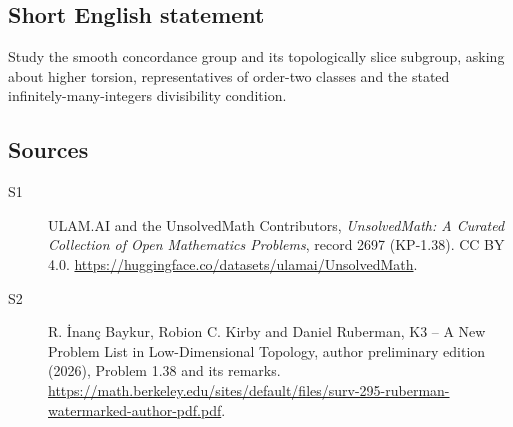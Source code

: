 \documentclass[11pt]{article}
\begin{document}
\subsection{Short English statement}
Study the smooth concordance group and its topologically slice subgroup, asking about higher torsion, representatives of order-two classes and the stated infinitely-many-integers divisibility condition.
\subsection{Sources}
\begin{description}
\item[\hypertarget{source:2697:1}{S1}] ULAM.AI and the UnsolvedMath Contributors, \emph{UnsolvedMath: A Curated Collection of Open Mathematics Problems}, record 2697 (KP-1.38). CC BY 4.0. \url{https://huggingface.co/datasets/ulamai/UnsolvedMath}.
\item[\hypertarget{source:2697:2}{S2}] R. \.{I}nan\c{c} Baykur, Robion C. Kirby and Daniel Ruberman, K3 -- A New Problem List in Low-Dimensional Topology, author preliminary edition (2026), Problem 1.38 and its remarks. \url{https://math.berkeley.edu/sites/default/files/surv-295-ruberman-watermarked-author-pdf.pdf}.
\end{description}
\label{end:2697}
\end{document}
